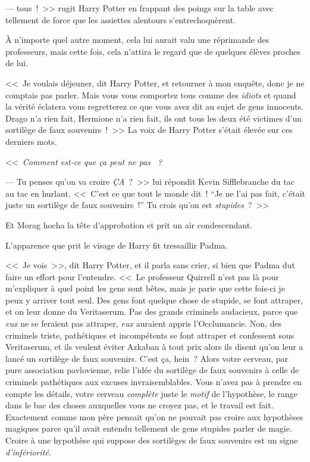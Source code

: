 ---  tous~!~>> rugit Harry Potter en frappant des poings sur la table avec tellement de force que les assiettes alentours s'entrechoquèrent.

À n'importe quel autre moment, cela lui aurait valu une réprimande des professeurs, mais cette fois, cela n'attira le regard que de quelques élèves proches de lui.

<<~Je voulais déjeuner, dit Harry Potter, et retourner à mon enquête, donc je ne comptais pas parler. Mais vous vous comportez tous comme des \emph{idiots} et quand la vérité éclatera vous regretterez ce que vous avez dit au sujet de gens innocents. Drago n'a rien fait, Hermione n'a rien fait, ils ont tous les deux été victimes d'un sortilège de faux souvenirs~!~>> La voix de Harry Potter s'était élevée sur ces derniers mots.

<<~\emph{Comment est-ce que ça peut ne pas ~?}

--- Tu penses qu'on va croire \emph{ÇA}~?~>> lui répondit Kevin Sifflebranche du tac au tac en hurlant. <<~C'est ce que tout le monde dit~! “Je ne l'ai pas fait, c'était juste un sortilège de faux souvenirs~!” Tu crois qu'on est \emph{stupides}~?~>>

Et Morag hocha la tête d'approbation et prit un air condescendant.

L'apparence que prit le visage de Harry fit tressaillir Padma.

<<~Je vois~>>, dit Harry Potter, et il parla sans crier, si bien que Padma dut faire un effort pour l'entendre. <<~Le professeur Quirrell n'est pas là pour m'expliquer à quel point les gens sont bêtes, mais je parie que cette fois-ci je peux y arriver tout seul. Des gens font quelque chose de stupide, se font attraper, et on leur donne du Veritaserum. Pas des grands criminels audacieux, parce que \emph{eux} ne se feraient pas attraper, \emph{eux} auraient appris l'Occlumancie. Non, des criminels triste, pathétiques et incompétents se font attraper et confessent sous Veritaserum, et ils veulent éviter Azkaban à tout prix alors ils disent qu'on leur a lancé un sortilège de faux souvenirs. C'est ça, hein~? Alors votre cerveau, par pure association pavlovienne, relie l'idée du sortilège de faux souvenirs à celle de criminels pathétiques aux excuses invraisemblables. Vous n'avez pas à prendre en compte les détails, votre cerveau \emph{complète} juste le \emph{motif} de l'hypothèse, le range dans le bac des choses auxquelles vous ne croyez pas, et le travail est fait. Exactement comme mon père pensait qu'on ne pouvait pas croire aux hypothèses magiques parce qu'il avait entendu tellement de gens stupides parler de magie. Croire à une hypothèse qui suppose des sortilèges de faux souvenirs est un signe \emph{d'infériorité}.


